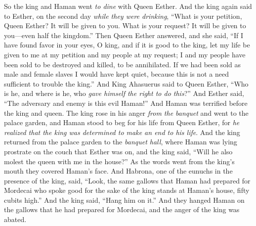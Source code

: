 \begin{biblechapter} %
 So the king and Haman went \textit{to dine} with Queen Esther.
\verse And the king again said to Esther, on the second day \textit{while they were drinking}, “What is your petition, Queen Esther? It will be given to you. What is your request? It will be given to you—even half the kingdom.”
\verse Then Queen Esther answered, and she said, “If I have found favor in your eyes, O king, and if it is good to the king, let my life be given to me at my petition and my people at my request;
\verse I and my people have been sold to be destroyed and killed, to be annihilated. If we had been sold as male and female slaves I would have kept quiet, because this is not a need sufficient to trouble the king.”
\verse And King Ahasuerus said to Queen Esther, “Who is he, and where is he, who \textit{gave himself the right to do this}?”
\verse And Esther said, “The adversary and enemy is this evil Haman!” And Haman was terrified before the king and queen.
 The king rose in his anger \textit{from the banquet} and went to the palace garden, and Haman stood to beg for his life from Queen Esther, for \textit{he realized that the king was determined to make an end to his life}.
\verse And the king returned from the palace garden to the \textit{banquet hall}, where Haman was lying prostrate on the couch that Esther was on, and the king said, “Will he also molest the queen with me in the house?” As the words went from the king’s mouth they covered Haman’s face.
\verse And Habrona, one of the eunuchs in the presence of the king, said, “Look, the same gallows that Haman had prepared for Mordecai who spoke good for the sake of the king stands at Haman’s house, fifty cubits high.” And the king said, “Hang him on it.”
\verse And they hanged Haman on the gallows that he had prepared for Mordecai, and the anger of the king was abated.
\end{biblechapter}

